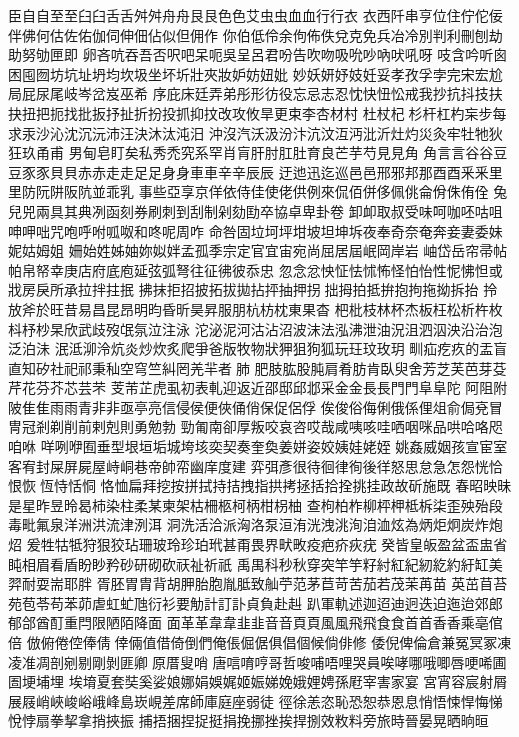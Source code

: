 ⾂自⾃至⾄臼⾅舌⾆舛⾇舟⾈艮⾉色⾊艾虫⾍血⾎行⾏衣
⾐西阡串亨位住佇佗佞伴佛何估佐佑伽伺伸佃佔似但佣作
你伯低伶余佝佈佚兌克免兵冶冷別判利刪刨劫助努劬匣即
卵吝吭吞吾否呎吧呆呃吳呈呂君吩告吹吻吸吮吵吶吠吼呀
吱含吟听囪困囤囫坊坑址坍均坎圾坐坏圻壯夾妝妒妨妞妣
妙妖妍妤妓妊妥孝孜孚孛完宋宏尬局屁尿尾岐岑岔岌巫希
序庇床廷弄弟彤形彷役忘忌志忍忱快忸忪戒我抄抗抖技扶
抉扭把扼找批扳抒扯折扮投抓抑抆改攻攸旱更束李杏材村
杜杖杞杉杆杠杓杗步每求汞沙沁沈沉沅沛汪決沐汰沌汨
沖沒汽沃汲汾汴沆汶沍沔沘沂灶灼災灸牢牡牠狄狂玖甬甫
男甸皂盯矣私秀禿究系罕肖肓肝肘肛肚育良芒芋芍見⾒角
⾓言⾔谷⾕豆⾖豕⾗貝⾙赤⾚走⾛足⾜身⾝車⾞辛⾟辰⾠
迂迆迅迄巡⾢邑邢邪邦那酉⾣釆⾤里⾥防阮阱阪阬並乖乳
事些亞享京佯依侍佳使佬供例來侃佰併侈佩佻侖佾侏侑佺
兔兒兕兩具其典冽函刻券刷刺到刮制剁劾劻卒協卓卑卦卷
卸卹取叔受味呵咖呸咕咀呻呷咄咒咆呼咐呱呶和咚呢周咋
命咎固垃坷坪坩坡坦坤坼夜奉奇奈奄奔妾妻委妹妮姑姆姐
姍始姓姊妯妳姒姅孟孤季宗定官宜宙宛尚屈居屆岷岡岸岩
岫岱岳帘帚帖帕帛帑幸庚店府底庖延弦弧弩往征彿彼忝忠
忽念忿怏怔怯怵怖怪怕怡性怩怫怛或戕房戾所承拉拌拄抿
拂抹拒招披拓拔拋拈抨抽押拐拙拇拍抵拚抱拘拖拗拆抬
拎放斧於旺昔易昌昆昂明昀昏昕昊昇服朋杭枋枕東果杳
杷枇枝林杯杰板枉松析杵枚枓杼杪杲欣武歧歿氓氛泣注泳
沱泌泥河沽沾沼波沫法泓沸泄油況沮泗泅泱沿治泡泛泊沬
泯泜泖泠炕炎炒炊炙爬爭爸版牧物狀狎狙狗狐玩玨玟玫玥
甽疝疙疚的盂盲直知矽社祀祁秉秈空穹竺糾罔羌羋者肺
肥肢肱股肫肩肴肪肯臥臾舍芳芝芙芭芽芟芹花芬芥芯芸芣
芰芾芷虎虱初表軋迎返近邵邸邱邶采金⾦長⾧門⾨阜⾩陀
阿阻附陂隹⾫雨⾬青⾮非亟亭亮信侵侯便俠俑俏保促侶俘
俟俊俗侮俐俄係俚俎俞侷兗冒冑冠剎剃削前剌剋則勇勉勃
勁匍南卻厚叛咬哀咨哎哉咸咦咳哇哂咽咪品哄哈咯咫咱咻
咩咧咿囿垂型垠垣垢城垮垓奕契奏奎奐姜姘姿姣姨娃姥姪
姚姦威姻孩宣宦室客宥封屎屏屍屋峙峒巷帝帥帟幽庠度建
弈弭彥很待徊律徇後徉怒思怠急怎怨恍恰恨恢恆恃恬恫
恪恤扁拜挖按拼拭持拮拽指拱拷拯括拾拴挑挂政故斫施既
春昭映昧是星昨昱昤曷柿染柱柔某柬架枯柵柩柯柄柑枴柚
查枸柏柞柳枰柙柢柝柒歪殃殆段毒毗氟泉洋洲洪流津洌洱
洞洗活洽派洶洛泵洹洧洸洩洮洵洎洫炫為炳炬炯炭炸炮炤
爰牲牯牴狩狠狡玷珊玻玲珍珀玳甚甭畏界畎畋疫疤疥疢疣
癸皆皇皈盈盆盃盅省盹相眉看盾盼眇矜砂研砌砍祆祉祈祇
禹禺科秒秋穿突竿竽籽紂紅紀紉紇約紆缸美羿耐耍耑耶胖
胥胚胃胄背胡胛胎胞胤胝致舢苧范茅苣苛苦茄若茂茉苒苗
英茁苜苔苑苞苓苟苯茆虐虹虻虺衍衫要觔計訂訃貞負赴赳
趴軍軌述迦迢迪迥迭迫迤迨郊郎郁郃酋酊重閂限陋陌降面
⾯革⾰韋⾱韭⾲音⾳頁⾴風⾵飛⾶食⾷首⾸香⾹乘亳倌倍
倣俯倦倥俸倩倖倆值借倚倒們俺倀倔倨俱倡個候倘俳修
倭倪俾倫倉兼冤冥冢凍凌准凋剖剜剔剛剝匪卿原厝叟哨
唐唁唷哼哥哲唆哺唔哩哭員唉哮哪哦唧唇哽唏圃圄埂埔埋
埃堉夏套奘奚娑娘娜娟娛娓姬娠娣娩娥娌娉孫屘宰害家宴
宮宵容宸射屑展屐峭峽峻峪峨峰島崁峴差席師庫庭座弱徒
徑徐恙恣恥恐恕恭恩息悄悟悚悍悔悌悅悖扇拳挈拿捎挾振
捕捂捆捏捉挺捐挽挪挫挨捍捌效敉料旁旅時晉晏晃晒晌晅
